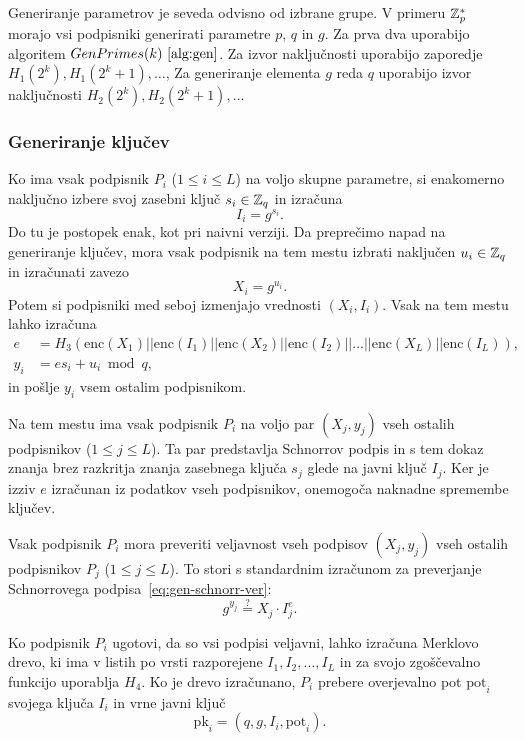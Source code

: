 \begin{primer}
    Generiranje parametrov je seveda odvisno od izbrane grupe. V primeru $\mathbb Z_p^*$ morajo vsi podpisniki
    generirati parametre $p$, $q$ in $g$. Za prva dva uporabijo algoritem $GenPrimes(k)~\ref{alg:gen}$.
    Za izvor naključnosti uporabijo zaporedje $H_1(2^k), H_1(2^k + 1), \dots$, Za generiranje elementa
    $g$ reda $q$ uporabijo izvor naključnosti $H_2(2^k), H_2(2^k + 1), \dots$
\end{primer}

\subsubsection{Generiranje ključev}
Ko ima vsak podpisnik $P_i$ ($1 \le i \le L$) na voljo skupne parametre, si enakomerno naključno
izbere svoj zasebni ključ $s_i \in \mathbb Z_q$ in izračuna
$$ 
I_i = g^{s_i}.
$$
Do tu je postopek enak, kot pri naivni verziji. Da preprečimo napad na generiranje ključev, mora
vsak podpisnik na tem mestu izbrati naključen $u_i \in \mathbb Z_q$ in izračunati zavezo
$$
X_i = g^{u_i}.
$$
Potem si podpisniki med seboj izmenjajo vrednosti $(X_i, I_i)$. Vsak na tem mestu lahko izračuna
\begin{align*}
    e &= H_3(\text{enc}(X_1) || \text{enc}(I_1) || \text{enc}(X_2) || \text{enc}(I_2) || \dots || \text{enc}(X_L) || \text{enc}(I_L)), \\
    y_i &= e s_i + u_i \bmod q,
\end{align*}
in pošlje $y_i$ vsem ostalim podpisnikom.

Na tem mestu ima vsak podpisnik $P_i$ na voljo par $(X_j, y_j)$ vseh ostalih podpisnikov ($1 \le j
\le L$). Ta par predstavlja Schnorrov podpis in s tem dokaz znanja brez razkritja znanja zasebnega
ključa $s_j$ glede na javni ključ $I_j$. Ker je izziv $e$ izračunan iz podatkov vseh podpisnikov,
onemogoča naknadne spremembe ključev.

Vsak podpisnik $P_i$ mora preveriti veljavnost vseh podpisov $(X_j, y_j)$ vseh ostalih podpisnikov
$P_j$ ($1 \le j \le L$). To stori s standardnim izračunom za preverjanje Schnorrovega
podpisa~\eqref{eq:gen-schnorr-ver}:
$$
g^{y_j} \stackrel{?}{=} X_j \cdot I_j^{e}.
$$

Ko podpisnik $P_i$ ugotovi, da so vsi podpisi veljavni, lahko izračuna Merklovo drevo, ki ima v
listih po vrsti razporejene $I_1, I_2, \dots, I_L$ in za svojo zgoščevalno funkcijo uporablja $H_4$.
Ko je drevo izračunano, $P_i$ prebere overjevalno pot $\text{pot}_i$ svojega ključa $I_i$ in vrne
javni ključ
$$ 
\text{pk}_i = (q, g, I_i, \text{pot}_i).
$$

